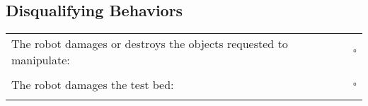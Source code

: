\subsection*{Disqualifying Behaviors}
\begin{tabular}{ l c}
The robot damages or destroys the objects requested to manipulate: & $\square$ \\ \\
The robot damages the test bed: & $\square$ \\ \\
\end{tabular}


